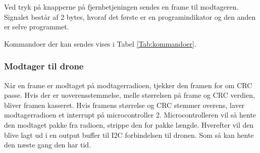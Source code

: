 \documentclass[Main]{subfiles}
\begin{document}
Ved tryk på knapperne på fjernbetjeningen sendes en frame til modtageren.
Signalet består af 2 bytes, hvoraf det første er en programindikator og den anden er selve programmet.



Kommandoer der kan sendes vises i Tabel \ref{Tab:kommandoer}.



\subsubsection{Modtager til drone}
Når en frame er modtaget på modtagerradioen, tjekker den framen for om CRC passe. Hvis der er uoverensstemmelse, melle størrelsen på frame og CRC verdien, bliver framen kasseret. Hvis framens størrelse og CRC stemmer overens, laver modtagerradioen et interrupt på microcontroller 2. Microcontrolleren vil så hente den modtaget pakke fra radioen, strippe den for pakke længde. Hverefter vil den blive lagt ud i en output buffer til I2C forbindelsen til dronen. Som så kan hente den næste gang den har tid. 
\end{document}
